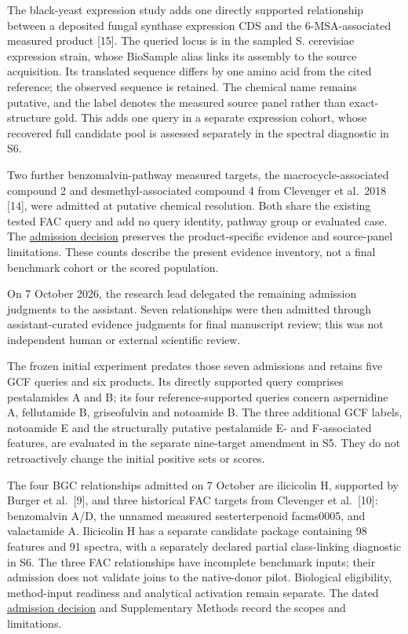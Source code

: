 \documentclass[
  10pt,
  a4paper,
]{article}
\begin{document}
The black-yeast expression study adds one directly supported relationship between a deposited fungal synthase expression CDS and the 6-MSA-associated measured product {[}15{]}. The queried locus is in the sampled S. cerevisiae expression strain, whose BioSample alias links its assembly to the source acquisition. Its translated sequence differs by one amino acid from the cited reference; the observed sequence is retained. The chemical name remains putative, and the label denotes the measured source panel rather than exact-structure gold. This adds one query in a separate expression cohort, whose recovered full candidate pool is assessed separately in the spectral diagnostic in S6.

Two further benzomalvin-pathway measured targets, the macrocycle-associated compound 2 and desmethyl-associated compound 4 from Clevenger et al.~2018 {[}14{]}, were admitted at putative chemical resolution. Both share the existing tested FAC query and add no query identity, pathway group or evaluated case. The \href{https://github.com/vinvomero/fungallink-benchmark/blob/main/protocol/decisions/2026-10-09-benzomalvin-two-measured-targets.md}{admission decision} preserves the product-specific evidence and source-panel limitations. These counts describe the present evidence inventory, not a final benchmark cohort or the scored population.

On 7 October 2026, the research lead delegated the remaining admission judgments to the assistant. Seven relationships were then admitted through assistant-curated evidence judgments for final manuscript review; this was not independent human or external scientific review.

The frozen initial experiment predates those seven admissions and retains five GCF queries and six products. Its directly supported query comprises pestalamides A and B; its four reference-supported queries concern aspernidine A, fellutamide B, griseofulvin and notoamide B. The three additional GCF labels, notoamide E and the structurally putative pestalamide E- and F-associated features, are evaluated in the separate nine-target amendment in S5. They do not retroactively change the initial positive sets or scores.

The four BGC relationships admitted on 7 October are ilicicolin H, supported by Burger et al.~{[}9{]}, and three historical FAC targets from Clevenger et al.~{[}10{]}: benzomalvin A/D, the unnamed measured sesterterpenoid facms0005, and valactamide A. Ilicicolin H has a separate candidate package containing 98 features and 91 spectra, with a separately declared partial class-linking diagnostic in S6. The three FAC relationships have incomplete benchmark inputs; their admission does not validate joins to the native-donor pilot. Biological eligibility, method-input readiness and analytical activation remain separate. The dated \href{https://github.com/vinvomero/fungallink-benchmark/blob/main/protocol/decisions/2026-10-07-delegated-admission-dispositions.md}{admission decision} and Supplementary Methods record the scopes and limitations.
\end{document}
